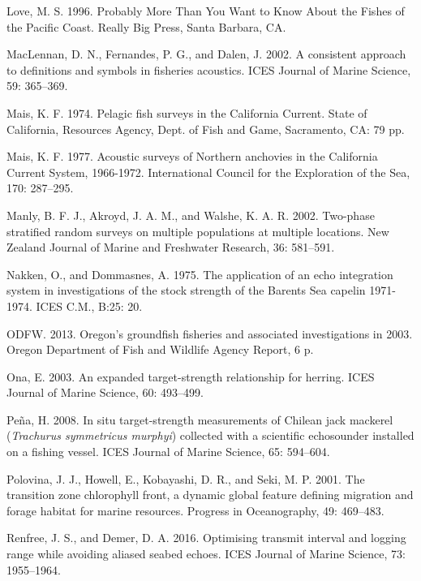 \documentclass[]{article}
\begin{document}
\leavevmode\hypertarget{ref-Love1996}{}%
Love, M. S. 1996. Probably More Than You Want to Know About the Fishes of the Pacific Coast. Really Big Press, Santa Barbara, CA.

\leavevmode\hypertarget{ref-MacLennan2002}{}%
MacLennan, D. N., Fernandes, P. G., and Dalen, J. 2002. A consistent approach to definitions and symbols in fisheries acoustics. ICES Journal of Marine Science, 59: 365--369.

\leavevmode\hypertarget{ref-Mais1974}{}%
Mais, K. F. 1974. Pelagic fish surveys in the California Current. State of California, Resources Agency, Dept. of Fish and Game, Sacramento, CA: 79 pp.

\leavevmode\hypertarget{ref-Mais1977}{}%
Mais, K. F. 1977. Acoustic surveys of Northern anchovies in the California Current System, 1966-1972. International Council for the Exploration of the Sea, 170: 287--295.

\leavevmode\hypertarget{ref-Manly2002}{}%
Manly, B. F. J., Akroyd, J. A. M., and Walshe, K. A. R. 2002. Two-phase stratified random surveys on multiple populations at multiple locations. New Zealand Journal of Marine and Freshwater Research, 36: 581--591.

\leavevmode\hypertarget{ref-Nakken1975}{}%
Nakken, O., and Dommasnes, A. 1975. The application of an echo integration system in investigations of the stock strength of the Barents Sea capelin 1971-1974. ICES C.M., B:25: 20.

\leavevmode\hypertarget{ref-ODFW2013}{}%
ODFW. 2013. Oregon's groundfish fisheries and associated investigations in 2003. Oregon Department of Fish and Wildlife Agency Report, 6 p.

\leavevmode\hypertarget{ref-Ona2003}{}%
Ona, E. 2003. An expanded target-strength relationship for herring. ICES Journal of Marine Science, 60: 493--499.

\leavevmode\hypertarget{ref-Pena2008}{}%
Peña, H. 2008. In situ target-strength measurements of Chilean jack mackerel (\emph{Trachurus symmetricus murphyi}) collected with a scientific echosounder installed on a fishing vessel. ICES Journal of Marine Science, 65: 594--604.

\leavevmode\hypertarget{ref-Polovina2001}{}%
Polovina, J. J., Howell, E., Kobayashi, D. R., and Seki, M. P. 2001. The transition zone chlorophyll front, a dynamic global feature defining migration and forage habitat for marine resources. Progress in Oceanography, 49: 469--483.

\leavevmode\hypertarget{ref-Renfree2016}{}%
Renfree, J. S., and Demer, D. A. 2016. Optimising transmit interval and logging range while avoiding aliased seabed echoes. ICES Journal of Marine Science, 73: 1955--1964.
\end{document}
